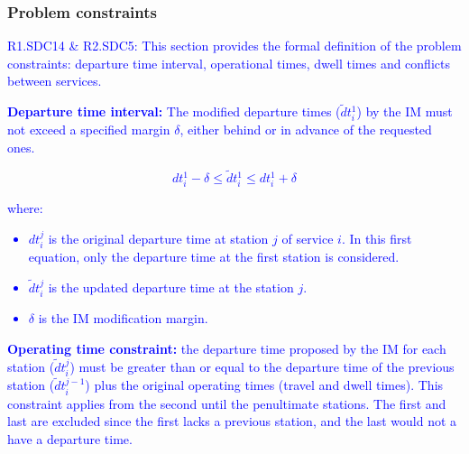 \documentclass[Afour,sagev,times]{sagej}
\newcommand{\primero}[1]{\textcolor{blue}{#1}}
\begin{document}
\subsubsection{Problem constraints}
\label{constraints}

\primero{R1.SDC14 \& R2.SDC5: This section provides the formal definition of the problem constraints: departure time interval, operational times, dwell times and conflicts between services.}

\primero{\textbf{Departure time interval:} The modified departure times ($  \tilde dt_{i}^{1} $) by the \gls{IM} must not exceed a specified margin $\delta$, either behind or in advance of the requested ones.} 


\primero{
\begin{equation}
    dt_{i}^{1} - \delta \leq \tilde dt_{i}^{1} \leq dt_{i}^{1} + \delta
\end{equation}
}

\primero{
where:
\begin{itemize}
  \item $dt_{i}^{j}$ is the original departure time at station $j$ of service $i$. In this first equation, only the departure time at the first station is considered.
  \item $\tilde dt_{i}^{j}$ is the updated departure time at the station $ j $.
  \item $\delta$ is the \gls{IM} modification margin.
\end{itemize}
}

\primero{\textbf{Operating time constraint:} the departure time proposed by the \gls{IM} for each station ($ \tilde dt_{i}^{j} $) must be greater than or equal to the departure time of the previous station ($ \tilde dt_{i}^{j-1} $) plus the original operating times (travel and dwell times). This constraint applies from the second until the penultimate stations. The first and last are excluded since the first lacks a previous station, and the last would not a have a departure time.}
\end{document}

